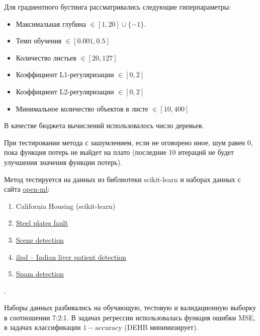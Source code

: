 \documentclass[a4paper,12pt]{article}
\begin{document}
Для градиентного бустинга рассматривались следующие гиперпараметры:
\begin{itemize}
    \item Максимальная глубина $\in [1, 20] \cup \{-1\}.$
    \item Темп обучения $\in [0.001, 0.5]$
    \item Количество листьев $\in [20, 127]$
    \item Коэффициент L1-регуляризации $\in [0, 2]$
    \item Коэффициент L2-регуляризации $\in [0, 2]$
    \item Минимальное количество объектов в листе $\in [10, 400]$
    
\end{itemize}
В качестве бюджета вычислений использовалось число деревьев.

При тестировании метода с зашумлением, если не оговорено иное, шум равен 0, пока функция потерь не выйдет на плато (последние 10 итераций не будет улучшения значения функции потерь).

Метод тестируется на  данных из библиотеки scikit-learn и наборах данных с сайта \href{https://www.openml.org/}{open-ml}:
\begin{enumerate}
    \item California Housing (scikit-learn)
    \item \href{https://www.openml.org/search?type=data&status=active&id=1504&sort=runs}{Steel plates fault}
    \item \href{https://www.openml.org/search?type=data&status=active&id=312}{Scene detection}
    \item \href{https://www.openml.org/search?type=data&status=active&id=1480}{ilpd -- Indian liver patient detection}
    \item \href{https://www.openml.org/search?type=data&status=active&id=44}{Spam detection}
\end{enumerate}.

Наборы данных разбивались на обучающую, тестовую и валидационную выборку в соотношении 7:2:1. В задачах регрессии использовалась функция ошибки MSE, в задачах классификации $1 - \text{accuracy}$ (DEHB минимизирует).
\end{document}
